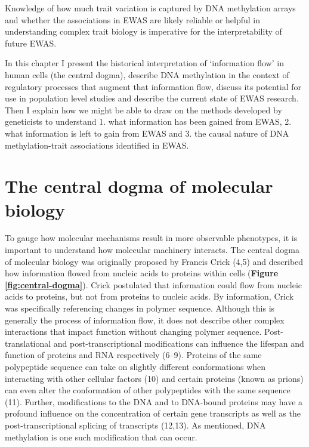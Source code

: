\documentclass[11pt,oneside]{bristolthesis}
\begin{document}
Knowledge of how much trait variation is captured by DNA methylation arrays and whether the associations in EWAS are likely reliable or helpful in understanding complex trait biology is imperative for the interpretability of future EWAS.

In this chapter I present the historical interpretation of `information flow' in human cells (the central dogma), describe DNA methylation in the context of regulatory processes that augment that information flow, discuss its potential for use in population level studies and describe the current state of EWAS research. Then I explain how we might be able to draw on the methods developed by geneticists to understand 1. what information has been gained from EWAS, 2. what information is left to gain from EWAS and 3. the causal nature of DNA methylation-trait associations identified in EWAS.

\hypertarget{the-central-dogma-of-molecular-biology}{%
\section{The central dogma of molecular biology}\label{the-central-dogma-of-molecular-biology}}

To gauge how molecular mechanisms result in more observable phenotypes, it is important to understand how molecular machinery interacts. The central dogma of molecular biology was originally proposed by Francis Crick (4,5) and described how information flowed from nucleic acids to proteins within cells (\textbf{Figure \ref{fig:central-dogma}}). Crick postulated that information could flow from nucleic acids to proteins, but not from proteins to nucleic acids. By information, Crick was specifically referencing changes in polymer sequence. Although this is generally the process of information flow, it does not describe other complex interactions that impact function without changing polymer sequence. Post-translational and post-transcriptional modifications can influence the lifespan and function of proteins and RNA respectively (6--9). Proteins of the same polypeptide sequence can take on slightly different conformations when interacting with other cellular factors (10) and certain proteins (known as prions) can even alter the conformation of other polypeptides with the same sequence (11). Further, modifications to the DNA and to DNA-bound proteins may have a profound influence on the concentration of certain gene transcripts as well as the post-transcriptional splicing of transcripts (12,13). As mentioned, DNA methylation is one such modification that can occur.
\end{document}
